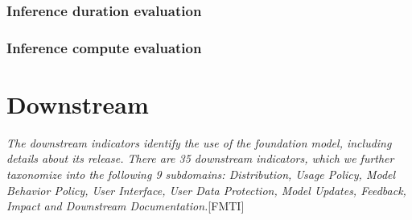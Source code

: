 \documentclass{article}
\begin{document}
\subsubsection{Inference duration evaluation}


\subsubsection{Inference compute evaluation}


\section{Downstream}
\textit{The downstream indicators identify the use of the foundation model, including details about its release. There are 35 downstream indicators, which we further taxonomize into the following 9 subdomains: Distribution, Usage Policy, Model Behavior Policy, User Interface, User Data Protection, Model Updates, Feedback, Impact and Downstream Documentation.}[FMTI]
\end{document}
